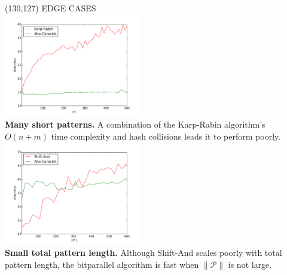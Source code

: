 \documentclass[a4paper]{article} %
\newcommand{\norm}[1]{\lVert#1\rVert}
\begin{document}
  \begin{textblock}{60}(130,127)
    {\sffamily\normalsize{\color{sciorange}EDGE CASES}}\vspace{0.2mm}\\
    \footnotesize 
      \includegraphics[width=60mm]{KRvAC.pdf}\\
      \textbf{Many short patterns.} A combination of the Karp-Rabin algorithm's $O(n+m)$ time complexity and hash collisions leads it to perform poorly.\\
      \includegraphics[width=60mm]{SAvAC.pdf}\\
      \textbf{Small total pattern length.} Although Shift-And scales poorly with total pattern length, the bitparallel algorithm is fast when $\norm{\mathcal P}$ is not large.
  \end{textblock}
\end{document}
